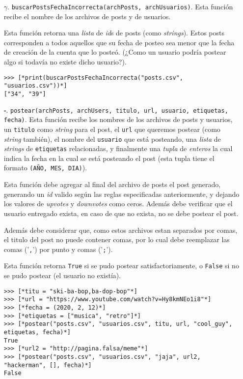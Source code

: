 \begin{enumerate}

    \item[$\gamma$.] \texttt{buscarPostsFechaIncorrecta(archPosts, archUsuarios)}. Esta función recibe el nombre de los archivos de posts y de usuarios.

    Esta función retorna una \textit{lista} de \textit{id}s de posts (como \textit{strings}). Estos posts corresponden a todos aquellos que su fecha de posteo sea menor que la fecha de creación de la cuenta que lo posteó. (¿Como un usuario podría postear algo si todavía no existe dicho usuario?).

    \begin{lstlisting}[style=consola]
>>> [*print(buscarPostsFechaIncorrecta("posts.csv", "usuarios.csv"))*]
["34", "39"]
    \end{lstlisting}

    \item[$\square$.] \texttt{postear(archPosts, archUsers, titulo, url, usuario, etiquetas, fecha)}. Esta función recibe los nombres de los archivos de posts y usuarios, un \texttt{titulo} como \textit{string} para el post, el \texttt{url} que queremos postear (como \textit{string} también), el nombre del \texttt{usuario} que está posteando, una \textit{lista} de \textit{strings} de \texttt{etiquetas} relacionadas, y finalmente una \textit{tupla} de \textit{enteros} la cual indica la fecha en la cual se está posteando el post (esta tupla tiene el formato \texttt{(AÑO, MES, DIA)}).

    Esta función debe agregar al final del archivo de posts el post generado, generando un \textit{id} valido según las reglas especificadas anteriormente, y dejando los valores de \textit{upvotes} y \textit{downvotes} como ceros. Además debe verificar que el usuario entregado exista, en caso de que no exista, no se debe postear el post.

    Además debe considerar que, como estos archivos estan separados por comas, el titulo del post no puede contener comas, por lo cual debe reemplazar las comas ('\texttt{,}') por punto y comas ('\texttt{;}').

    Esta función retorna \texttt{True} si se pudo postear satisfactoriamente, o \texttt{False} si no se pudo postear (el usuario no existía).

    \begin{lstlisting}[style=consola]
>>> [*titu = "ski-ba-bop,ba-dop-bop"*]
>>> [*url = "https://www.youtube.com/watch?v=Hy8kmNEo1i8"*]
>>> [*fecha = (2020, 2, 12)*]
>>> [*etiquetas = ["musica", "retro"]*]
>>> [*postear("posts.csv", "usuarios.csv", titu, url, "cool_guy", etiquetas, fecha)*]
True
>>> [*url2 = "http://pagina.falsa/meme"*]
>>> [*postear("posts.csv", "usuarios.csv", "jaja", url2, "hackerman", [], fecha)*]
False
    \end{lstlisting}

\end{enumerate}

